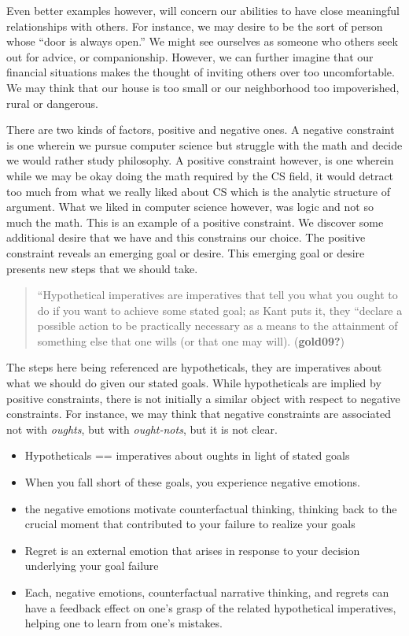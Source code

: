 \documentclass[
]{article}
\begin{document}
Even better examples however, will concern our abilities to have close
meaningful relationships with others. For instance, we may desire to be
the sort of person whose ``door is always open.'' We might see ourselves
as someone who others seek out for advice, or companionship. However, we
can further imagine that our financial situations makes the thought of
inviting others over too uncomfortable. We may think that our house is
too small or our neighborhood too impoverished, rural or dangerous.

There are two kinds of factors, positive and negative ones. A negative
constraint is one wherein we pursue computer science but struggle with
the math and decide we would rather study philosophy. A positive
constraint however, is one wherein while we may be okay doing the math
required by the CS field, it would detract too much from what we really
liked about CS which is the analytic structure of argument. What we
liked in computer science however, was logic and not so much the math.
This is an example of a positive constraint. We discover some additional
desire that we have and this constrains our choice. The positive
constraint reveals an emerging goal or desire. This emerging goal or
desire presents new steps that we should take.

\begin{quote}
``Hypothetical imperatives are imperatives that tell you what you ought
to do if you want to achieve some stated goal; as Kant puts it, they
``declare a possible action to be practically necessary as a means to
the attainment of something else that one wills (or that one may will).
(\textbf{gold09?})
\end{quote}

The steps here being referenced are hypotheticals, they are imperatives
about what we should do given our stated goals. While hypotheticals are
implied by positive constraints, there is not initially a similar object
with respect to negative constraints. For instance, we may think that
negative constraints are associated not with \emph{oughts}, but with
\emph{ought-nots}, but it is not clear.

\begin{itemize}
\item
  Hypotheticals == imperatives about oughts in light of stated goals
\item
  When you fall short of these goals, you experience negative emotions.
\item
  the negative emotions motivate counterfactual thinking, thinking back
  to the crucial moment that contributed to your failure to realize your
  goals
\item
  Regret is an external emotion that arises in response to your decision
  underlying your goal failure
\item
  Each, negative emotions, counterfactual narrative thinking, and
  regrets can have a feedback effect on one's grasp of the related
  hypothetical imperatives, helping one to learn from one's mistakes.
\end{itemize}
\end{document}
